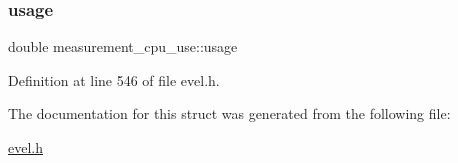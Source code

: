 \hypertarget{structmeasurement__cpu__use_a5407603f3d446b061c23256197e2979c}{}\label{structmeasurement__cpu__use_a5407603f3d446b061c23256197e2979c} 
\subsubsection{\texorpdfstring{usage}{usage}}
{\footnotesize\ttfamily double measurement\+\_\+cpu\+\_\+use\+::usage}



Definition at line 546 of file evel.\+h.



The documentation for this struct was generated from the following file\+:\begin{DoxyCompactItemize}
\item 
\hyperlink{evel_8h}{evel.\+h}\end{DoxyCompactItemize}
